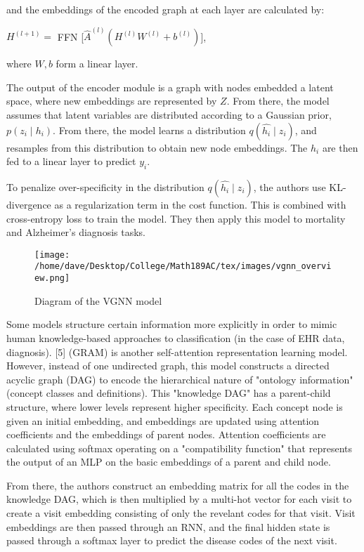 \documentclass{article}
\begin{document}
and the embeddings of the encoded graph at each layer are calculated by:

\begin{center}
$H^{(l+1)} = $ FFN [$\widehat{A}^{(l)}(H^{(l)}W^{(l)} + b^{(l)})$],
\end{center}
where $W,b$ form a linear layer.

The output of the encoder module is a graph with nodes embedded a latent space, where new embeddings are represented by $Z$. From there, the model assumes that latent variables are distributed according to a Gaussian prior, $p(z_i \mid h_i)$. From there, the model learns a distribution $q(\hat{h_i} \mid z_i) $, and resamples from this distribution to obtain new node embeddings. The $h_i$ are then fed to a linear layer to predict $y_i$.

To penalize over-specificity in the distribution $q(\hat{h_i} \mid z_i)$, the authors use KL-divergence as a regularization term in the cost function. This is combined with cross-entropy loss to train the model. They then apply this model to mortality and Alzheimer's diagnosis tasks. 


\begin{figure} [htbp!]
\centering
	\caption{Diagram of the VGNN model}
        \texttt{[image: /home/dave/Desktop/College/Math189AC/tex/images/vgnn\_overview.png]}
    \end{figure}
    
Some models structure certain information more explicitly in order to mimic human knowledge-based approaches to classification (in the case of EHR data, diagnosis).
[5] (GRAM) is another self-attention representation learning model. However, instead of one undirected graph, this model constructs a directed acyclic graph (DAG) to encode the hierarchical nature of "ontology information" (concept classes and definitions). This "knowledge DAG" has a parent-child structure, where lower levels represent higher specificity. Each concept node is given an initial embedding, and embeddings are updated using attention coefficients and the embeddings of parent nodes. Attention coefficients are calculated using softmax operating on a "compatibility function" that represents the output of an MLP on the basic embeddings of a parent and child node. 

From there, the authors construct an embedding matrix for all the codes in the knowledge DAG, which is then multiplied by a multi-hot vector for each visit to create a visit embedding consisting of only the revelant codes for that visit. Visit embeddings are then passed through an RNN, and the final hidden state is passed through a softmax layer to predict the disease codes of the next visit. 
\end{document}
